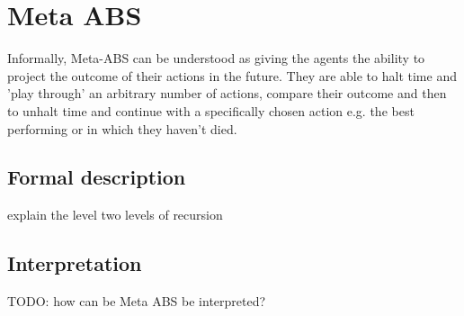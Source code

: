 \section{Meta ABS}
Informally, Meta-ABS can be understood as giving the agents the ability to project the outcome of their actions in the future. They are able to halt time and 'play through' an arbitrary number of actions, compare their outcome and then to unhalt time and continue with a specifically chosen action e.g. the best performing or in which they haven't died. 

\subsection{Formal description}
explain the level two levels of recursion

\subsection{Interpretation}
TODO: how can be Meta ABS be interpreted?